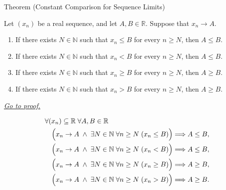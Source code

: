 \begin{theorembox}{Theorem (Constant Comparison for Sequence Limits)}
\begin{theorem}
\label{thm:constant-comparison-for-sequence-limits}

Let $(x_n)$ be a real sequence, and let $A,B\in\mathbb{R}$. Suppose
that $x_n\to A$.
\begin{enumerate}[label=(\alph*)]
  \item If there exists $N\in\mathbb{N}$ such that $x_n\le B$ for every
  $n\ge N$, then $A\le B$.
  \item If there exists $N\in\mathbb{N}$ such that $x_n<B$ for every
  $n\ge N$, then $A\le B$.
  \item If there exists $N\in\mathbb{N}$ such that $x_n\ge B$ for every
  $n\ge N$, then $A\ge B$.
  \item If there exists $N\in\mathbb{N}$ such that $x_n>B$ for every
  $n\ge N$, then $A\ge B$.
\end{enumerate}

\smallskip
\noindent
\hyperref[prf:constant-comparison-for-sequence-limits]{\textit{Go to proof.}}
\end{theorem}
\end{theorembox}

\begin{remark*}
\[
\begin{aligned}
&\forall (x_n)\subseteq\mathbb{R}\;\forall A,B\in\mathbb{R}\\
&\quad\Bigl(
  x_n\to A
  \;\land\;
  \exists N\in\mathbb{N}\;\forall n\ge N\;(x_n\le B)
\Bigr)
\Longrightarrow A\le B,\\
&\quad\Bigl(
  x_n\to A
  \;\land\;
  \exists N\in\mathbb{N}\;\forall n\ge N\;(x_n<B)
\Bigr)
\Longrightarrow A\le B,\\
&\quad\Bigl(
  x_n\to A
  \;\land\;
  \exists N\in\mathbb{N}\;\forall n\ge N\;(x_n\ge B)
\Bigr)
\Longrightarrow A\ge B,\\
&\quad\Bigl(
  x_n\to A
  \;\land\;
  \exists N\in\mathbb{N}\;\forall n\ge N\;(x_n>B)
\Bigr)
\Longrightarrow A\ge B.
\end{aligned}
\]
\end{remark*}

